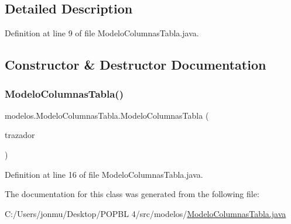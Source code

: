 \subsection{Detailed Description}


Definition at line 9 of file Modelo\+Columnas\+Tabla.\+java.



\subsection{Constructor \& Destructor Documentation}
\mbox{\label{classmodelos_1_1_modelo_columnas_tabla_a1ac636f1d60b6abb63e86834e6c8f09d}} 
\subsubsection{\texorpdfstring{Modelo\+Columnas\+Tabla()}{ModeloColumnasTabla()}}
{\footnotesize\ttfamily modelos.\+Modelo\+Columnas\+Tabla.\+Modelo\+Columnas\+Tabla (\begin{DoxyParamCaption}\item[{\mbox{\hyperlink{classmodelos_1_1_trazador_tabla_maquina}{Trazador\+Tabla\+Maquina}}}]{trazador }\end{DoxyParamCaption})}



Definition at line 16 of file Modelo\+Columnas\+Tabla.\+java.



The documentation for this class was generated from the following file\+:\begin{DoxyCompactItemize}
\item 
C\+:/\+Users/jonmu/\+Desktop/\+P\+O\+P\+B\+L 4/src/modelos/\mbox{\hyperlink{_modelo_columnas_tabla_8java}{Modelo\+Columnas\+Tabla.\+java}}\end{DoxyCompactItemize}
